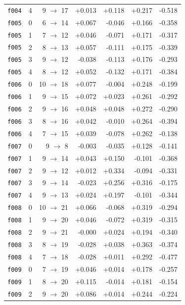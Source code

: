 \documentclass[11pt]{article}
\begin{document}
\begin{table}[htbp]
\begin{tabular}{llrrrrr}
\texttt{f004} & 4 & 9 $\to$ 17 & +0.013 & +0.118 & +0.217 & -0.518 \\
\texttt{f005} & 0 & 6 $\to$ 14 & +0.067 & -0.046 & +0.166 & -0.358 \\
\texttt{f005} & 1 & 7 $\to$ 12 & +0.046 & -0.071 & +0.171 & -0.317 \\
\texttt{f005} & 2 & 8 $\to$ 13 & +0.057 & -0.111 & +0.175 & -0.339 \\
\texttt{f005} & 3 & 9 $\to$ 12 & -0.038 & -0.113 & +0.176 & -0.293 \\
\texttt{f005} & 4 & 8 $\to$ 12 & +0.052 & -0.132 & +0.171 & -0.384 \\
\texttt{f006} & 0 & 10 $\to$ 18 & +0.077 & -0.004 & +0.248 & -0.199 \\
\texttt{f006} & 1 & 9 $\to$ 15 & +0.072 & +0.023 & +0.261 & -0.292 \\
\texttt{f006} & 2 & 9 $\to$ 16 & +0.048 & +0.048 & +0.272 & -0.290 \\
\texttt{f006} & 3 & 8 $\to$ 16 & +0.042 & -0.010 & +0.264 & -0.394 \\
\texttt{f006} & 4 & 7 $\to$ 15 & +0.039 & -0.078 & +0.262 & -0.138 \\
\texttt{f007} & 0 & 9 $\to$ 8 & -0.003 & -0.035 & +0.128 & -0.141 \\
\texttt{f007} & 1 & 9 $\to$ 14 & +0.043 & +0.150 & -0.101 & -0.368 \\
\texttt{f007} & 2 & 9 $\to$ 12 & +0.012 & +0.334 & -0.094 & -0.331 \\
\texttt{f007} & 3 & 9 $\to$ 14 & -0.023 & +0.256 & +0.316 & -0.175 \\
\texttt{f007} & 4 & 9 $\to$ 13 & +0.024 & +0.197 & -0.101 & -0.344 \\
\texttt{f008} & 0 & 10 $\to$ 21 & +0.066 & -0.068 & +0.319 & -0.294 \\
\texttt{f008} & 1 & 9 $\to$ 20 & +0.046 & -0.072 & +0.319 & -0.315 \\
\texttt{f008} & 2 & 9 $\to$ 21 & -0.000 & +0.024 & +0.194 & -0.340 \\
\texttt{f008} & 3 & 8 $\to$ 19 & -0.028 & +0.038 & +0.363 & -0.374 \\
\texttt{f008} & 4 & 7 $\to$ 18 & -0.028 & +0.011 & +0.292 & -0.477 \\
\texttt{f009} & 0 & 7 $\to$ 19 & +0.046 & +0.014 & +0.178 & -0.257 \\
\texttt{f009} & 1 & 8 $\to$ 20 & +0.115 & -0.014 & +0.181 & -0.154 \\
\texttt{f009} & 2 & 9 $\to$ 20 & +0.086 & +0.014 & +0.244 & -0.224 \\

\end{tabular}
\end{table}
\end{document}
